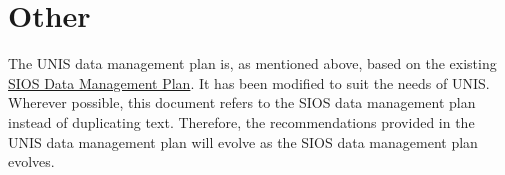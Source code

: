 \documentclass[a4paper,english, 11pt]{article}
\begin{document}
\section{Other}
\label{s:other}

The UNIS data management plan is, as mentioned above, based on the existing \href{https://sios-svalbard.org/sites/sios-svalbard.org/files/common/SIOS_Data_Management_Plan.pdf}{SIOS Data Management Plan}. It has been modified to suit the needs of UNIS. Wherever possible, this document refers to the SIOS data management plan instead of duplicating text. Therefore, the recommendations provided in the UNIS data management plan will evolve as the SIOS data management plan evolves. 
\end{document}

